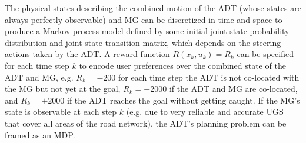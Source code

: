The physical states describing the combined motion of the ADT (whose states are always perfectly observable) and MG can be discretized in time and space to produce a Markov process model defined by some initial joint state probability distribution and joint state transition matrix, which depends on the steering actions taken by the ADT. 
A reward function $R(x_k,u_k) = R_k$ can be specified for each time step $k$ to encode user preferences over the combined state of the ADT and MG, e.g. $R_k = -200$ for each time step the ADT is not co-located with the MG but not yet at the goal, $R_k= -2000$ if the ADT and MG are co-located, and $R_k=+2000$ if the ADT reaches the goal without getting caught. 
If the MG's state is observable at each step $k$ (e.g. due to very reliable and accurate UGS that cover all areas of the road network), the ADT's planning problem can be framed as an MDP. 

